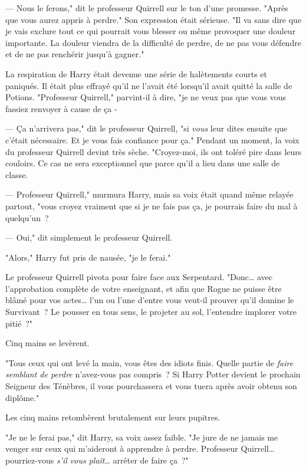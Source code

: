 --- Nous le ferons," dit le professeur Quirrell sur le ton d'une promesse. "Après que vous aurez appris à perdre." Son expression était sérieuse. "Il va sans dire que je vais exclure tout ce qui pourrait vous blesser ou même provoquer une douleur importante. La douleur viendra de la difficulté de perdre, de ne pas vous défendre et de ne pas renchérir jusqu'à gagner."

La respiration de Harry était devenue une série de halètements courts et paniqués. Il était plus effrayé qu'il ne l'avait été lorsqu'il avait quitté la salle de Potions. "Professeur Quirrell," parvint-il à dire, "je ne veux pas que vous vous fassiez renvoyer à cause de ça -

--- Ça n'arrivera pas," dit le professeur Quirrell, "si \emph{vous} leur dites ensuite que c'était nécessaire. Et je vous fais confiance pour ça." Pendant un moment, la voix du professeur Quirrell devint très sèche. "Croyez-moi, ils ont toléré pire dans leurs couloirs. Ce cas ne sera exceptionnel que parce qu'il a lieu dans une salle de classe.

--- Professeur Quirrell," murmura Harry, mais sa voix était quand même relayée partout, "vous croyez vraiment que si je ne fais pas ça, je pourrais faire du mal à quelqu'un~?

--- Oui," dit simplement le professeur Quirrell.

"Alors," Harry fut pris de nausée, "je le ferai."

Le professeur Quirrell pivota pour faire face aux Serpentard. "Donc… avec l'approbation complète de votre enseignant, et afin que Rogue ne puisse être blâmé pour vos actes… l'un ou l'une d'entre vous veut-il prouver qu'il domine le Survivant~? Le pousser en tous sens, le projeter au sol, l'entendre implorer votre pitié~?"

Cinq mains se levèrent.

"Tous ceux qui ont levé la main, vous êtes des idiots finis. Quelle partie de \emph{faire semblant de perdre} n'avez-vous pas compris~? Si Harry Potter devient le prochain Seigneur des Ténèbres, il vous pourchassera et vous tuera après avoir obtenu son diplôme."

Les cinq mains retombèrent brutalement sur leurs pupitres.

"Je ne le ferai pas," dit Harry, sa voix assez faible. "Je jure de ne jamais me venger sur ceux qui m'aideront à apprendre à perdre. Professeur Quirrell… pourriez-vous \emph{s'il vous plaît}… arrêter de faire ça~?"

